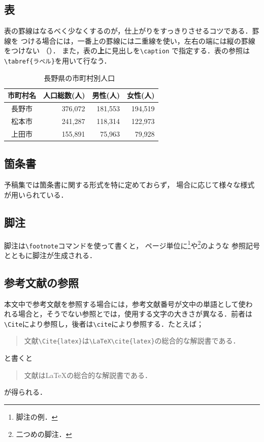 \documentclass[a4j, 9pt, twocolumn, twoside]{jsarticle}
\begin{document}
\subsection{表}
表の罫線はなるべく少なくするのが，仕上がりをすっきりさせるコツである．罫線を
つける場合には，一番上の罫線には二重線を使い，左右の端には縦の罫線をつけない 
（）．
また，表の\textbf{上}に見出しを\texttt{\textbackslash caption}
で指定する．表の参照は\texttt{\textbackslash tabref\{ラベル\}}を用いて行なう．

\begin{table}\small
\centering
\caption{長野県の市町村別人口~\cite{jinko}}
\label{tbl-jinko}
\begin{tabular}{c|r|r|r}
\hline\hline
市町村名 & 人口総数(人) & 男性(人) & 女性(人) \\ \hline
長野市 & 376,072 & 181,553 & 194,519 \\
松本市 & 241,287 & 118,314 & 122,973 \\
上田市 & 155,891 & 75,963 & 79,928
\end{tabular}
\end{table}


\subsection{箇条書}\label{sec:item*}
予稿集では箇条書に関する形式を特に定めておらず，
場合に応じて様々な様式が用いられている．

\subsection{脚注}
脚注は\texttt{\textbackslash footnote}コマンドを使って書くと，
ページ単位に\footnote{脚注の例．}や\footnote{二つめの脚注．}のような
参照記号とともに脚注が生成される．

\subsection{参考文献の参照}
本文中で参考文献を参照する場合には，参考文献番号が文中の単語として使わ
れる場合と，そうでない参照とでは，使用する文字の大きさが異なる．前者は
\verb+\Cite+により参照し，後者は\verb+\cite+により参照する．たとえば；

\begin{quote}
文献\verb+\Cite{latex}+は\verb+\LaTeX\cite{latex}+の総合的な解説書である．
\end{quote}
と書くと
\begin{quote}
文献\Cite{latex}は\LaTeX\cite{latex}の総合的な解説書である．
\end{quote}
が得られる．
\end{document}
